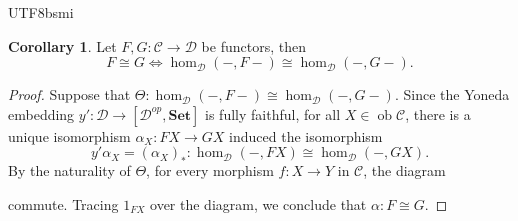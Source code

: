 \documentclass[12pt]{article}
\theoremstyle{definition}
\newtheorem{definition}{Definition}[section]
\newtheorem{corollary}[definition]{Corollary}
\newcommand\<{\langle}
\renewcommand\>{\rangle}
\DeclareMathOperator{\ob}{ob}
\begin{document}
\begin{CJK}{UTF8}{bsmi}
\begin{corollary}
\label{227}
    Let $F, G:\mathcal{C}\to\mathcal{D}$ be functors, then
    \[
        F\cong G\iff\hom_\mathcal{D}(-, F-)\cong\hom_\mathcal{D}(-, G-).
    \]
\end{corollary}
\begin{proof}
    Suppose that $\Theta:\hom_\mathcal{D}(-, F-)\cong\hom_\mathcal{D}(-, G-)$.
    Since the Yoneda embedding $y':\mathcal{D}\to[\mathcal{D}^{op}, \textbf{Set}]$ is fully faithful, for all $X\in\ob\mathcal{C}$, there is a unique isomorphism $\alpha_X:FX\to GX$ induced the isomorphism 
    \[
        y'\alpha_X=(\alpha_X)_*:\hom_\mathcal{D}(-, FX)\cong\hom_\mathcal{D}(-, GX).
    \]
    By the naturality of $\Theta$, for every morphism $f:X\to Y$ in $\mathcal{C}$, the diagram
    \begin{center}
    \end{center}
    commute.
    Tracing $1_{FX}$ over the diagram, we conclude that $\alpha:F\cong G$.
\end{proof}



\end{CJK}
\end{document}
